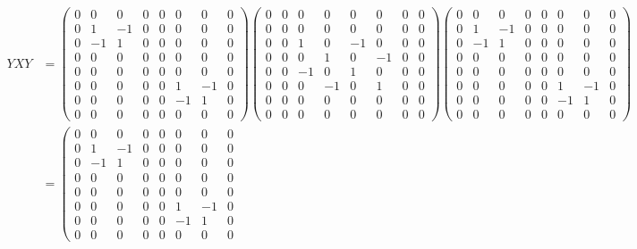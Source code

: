 \documentclass{article}
\begin{document}
\begin{align}
YXY&=
    \left(\begin{smallmatrix}
    0 & 0 & 0 & 0 & 0 & 0 & 0 & 0\\0 & 1 & -1 & 0 & 0 & 0 & 0 & 0\\0 & -1 & 1 & 0 & 0 & 0 & 0 & 0\\0 & 0 & 0 & 0 & 0 & 0 & 0 & 0\\0 & 0 & 0 & 0 & 0 & 0 & 0 & 0\\0 & 0 & 0 & 0 & 0 & 1 & -1 & 0\\0 & 0 & 0 & 0 & 0 & -1 & 1 & 0\\0 & 0 & 0 & 0 & 0 & 0 & 0 & 0
    \end{smallmatrix}\right)
    \left(\begin{smallmatrix}
    0 & 0 & 0 & 0 & 0 & 0 & 0 & 0\\0 & 0 & 0 & 0 & 0 & 0 & 0 & 0\\0 & 0 & 1 & 0 & -1 & 0 & 0 & 0\\0 & 0 & 0 & 1 & 0 & -1 & 0 & 0\\0 & 0 & -1 & 0 & 1 & 0 & 0 & 0\\0 & 0 & 0 & -1 & 0 & 1 & 0 & 0\\0 & 0 & 0 & 0 & 0 & 0 & 0 & 0\\0 & 0 & 0 & 0 & 0 & 0 & 0 & 0
    \end{smallmatrix}\right)
    \left(\begin{smallmatrix}
    0 & 0 & 0 & 0 & 0 & 0 & 0 & 0\\0 & 1 & -1 & 0 & 0 & 0 & 0 & 0\\0 & -1 & 1 & 0 & 0 & 0 & 0 & 0\\0 & 0 & 0 & 0 & 0 & 0 & 0 & 0\\0 & 0 & 0 & 0 & 0 & 0 & 0 & 0\\0 & 0 & 0 & 0 & 0 & 1 & -1 & 0\\0 & 0 & 0 & 0 & 0 & -1 & 1 & 0\\0 & 0 & 0 & 0 & 0 & 0 & 0 & 0
    \end{smallmatrix}\right)\\[0.2cm]
    &=\left(\begin{smallmatrix}
    0 & 0 & 0 & 0 & 0 & 0 & 0 & 0\\0 & 1 & -1 & 0 & 0 & 0 & 0 & 0\\0 & -1 & 1 & 0 & 0 & 0 & 0 & 0\\0 & 0 & 0 & 0 & 0 & 0 & 0 & 0\\0 & 0 & 0 & 0 & 0 & 0 & 0 & 0\\0 & 0 & 0 & 0 & 0 & 1 & -1 & 0\\0 & 0 & 0 & 0 & 0 & -1 & 1 & 0\\0 & 0 & 0 & 0 & 0 & 0 & 0 & 0

\end{smallmatrix}
\end{align}
\end{document}
